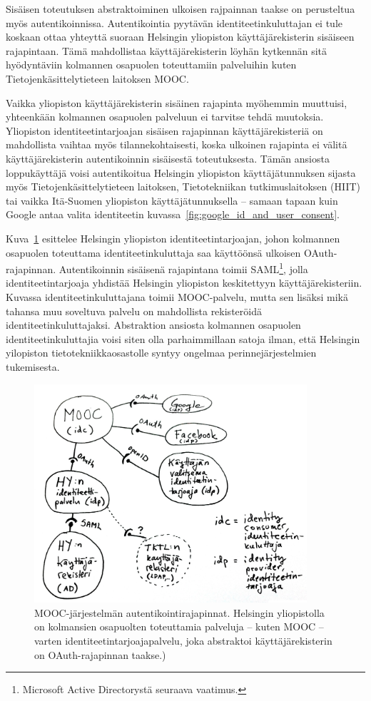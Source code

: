 \documentclass[finnish,gradu]{tktltiki}
\begin{document}
  Sisäisen toteutuksen abstraktoiminen ulkoisen rajpainnan taakse on perusteltua myös autentikoinnissa. Autentikointia pyytävän identiteetinkuluttajan ei tule koskaan ottaa yhteyttä suoraan Helsingin yliopiston käyttäjärekisterin sisäiseen rajapintaan. Tämä mahdollistaa käyttäjärekisterin löyhän kytkennän sitä hyödyntäviin kolmannen osapuolen toteuttamiin palveluihin kuten Tietojenkäsittelytieteen laitoksen MOOC.

  Vaikka yliopiston käyttäjärekisterin sisäinen rajapinta myöhemmin muuttuisi, yhteenkään kolmannen osapuolen palveluun ei tarvitse tehdä muutoksia. Yliopiston identiteetintarjoajan sisäisen rajapinnan käyttäjärekisteriä on mahdollista vaihtaa myös tilannekohtaisesti, koska ulkoinen rajapinta ei välitä käyttäjärekisterin autentikoinnin sisäisestä toteutuksesta. Tämän ansiosta loppukäyttäjä voisi autentikoitua Helsingin yliopiston käyttäjätunnuksen sijasta myös Tietojenkäsittelytieteen laitoksen, Tietotekniikan tutkimuslaitoksen (HIIT) tai vaikka Itä-Suomen yliopiston käyttäjätunnuksella -- samaan tapaan kuin Google antaa valita identiteetin kuvassa~\ref{fig:google_id_and_user_consent}.

  Kuva~\ref{fig:mooc_hy_idp} esittelee Helsingin yliopiston identiteetintarjoajan, johon kolmannen osapuolen toteuttama identiteetinkuluttaja saa käyttöönsä ulkoisen OAuth-rajapinnan. Autentikoinnin sisäisenä rajapintana toimii SAML\footnote{Microsoft Active Directorystä seuraava vaatimus.}, jolla identiteetintarjoaja yhdistää Helsingin yliopiston keskitettyyn käyttäjärekisteriin. Kuvassa identiteetinkuluttajana toimii MOOC-palvelu, mutta sen lisäksi mikä tahansa muu soveltuva palvelu on mahdollista rekisteröidä identiteetinkuluttajaksi. Abstraktion ansiosta kolmannen osapuolen identiteetinkuluttajia voisi siten olla parhaimmillaan satoja ilman, että Helsingin yilopiston tietotekniikkaosastolle syntyy ongelmaa perinnejärjestelmien tukemisesta.

  \begin{figure}[h!]
    \centering
    \includegraphics[width=0.9\textwidth]{images/mooc_hy_idp.jpg}
    \caption{MOOC-järjestelmän autentikointirajapinnat. Helsingin yliopistolla on kolmansien osapuolten toteuttamia palveluja -- kuten MOOC -- varten identiteetintarjoajapalvelu, joka abstraktoi käyttäjärekisterin on OAuth-rajapinnan taakse.)}
    \label{fig:mooc_hy_idp}
  \end{figure}
\end{document}
